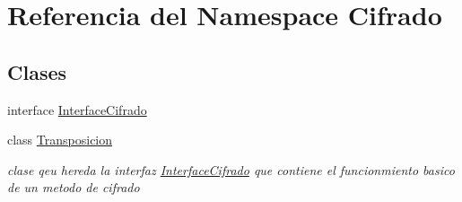\hypertarget{namespace_cifrado}{}\section{Referencia del Namespace Cifrado}
\label{namespace_cifrado}
\subsection*{Clases}
\begin{DoxyCompactItemize}
\item 
interface \hyperlink{interface_cifrado_1_1_interface_cifrado}{Interface\+Cifrado}
\item 
class \hyperlink{class_cifrado_1_1_transposicion}{Transposicion}
\begin{DoxyCompactList}\small\item\em clase qeu hereda la interfaz \hyperlink{interface_cifrado_1_1_interface_cifrado}{Interface\+Cifrado} que contiene el funcionmiento basico de un metodo de cifrado \end{DoxyCompactList}\end{DoxyCompactItemize}
